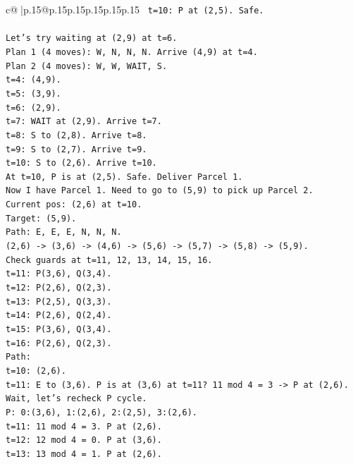 \documentclass{article}
\begin{document}
{\begin{supertabular}{c@{$\;$}|p{.15\linewidth}@{}p{.15\linewidth}p{.15\linewidth}p{.15\linewidth}p{.15\linewidth}p{.15\linewidth}}
{{{\texttt{   t=10: P at (2,5). Safe.} \\
\\ 
\texttt{Let's try waiting at (2,9) at t=6.} \\
\texttt{Plan 1 (4 moves): W, N, N, N. Arrive (4,9) at t=4.} \\
\texttt{Plan 2 (4 moves): W, W, WAIT, S.} \\
\texttt{t=4: (4,9).} \\
\texttt{t=5: (3,9).} \\
\texttt{t=6: (2,9).} \\
\texttt{t=7: WAIT at (2,9). Arrive t=7.} \\
\texttt{t=8: S to (2,8). Arrive t=8.} \\
\texttt{t=9: S to (2,7). Arrive t=9.} \\
\texttt{t=10: S to (2,6). Arrive t=10.} \\
\texttt{At t=10, P is at (2,5). Safe. Deliver Parcel 1.} \\
\texttt{Now I have Parcel 1. Need to go to (5,9) to pick up Parcel 2.} \\
\texttt{Current pos: (2,6) at t=10.} \\
\texttt{Target: (5,9).} \\
\texttt{Path: E, E, E, N, N, N.} \\
\texttt{(2,6) {-}> (3,6) {-}> (4,6) {-}> (5,6) {-}> (5,7) {-}> (5,8) {-}> (5,9).} \\
\texttt{Check guards at t=11, 12, 13, 14, 15, 16.} \\
\texttt{t=11: P(3,6), Q(3,4).} \\
\texttt{t=12: P(2,6), Q(2,3).} \\
\texttt{t=13: P(2,5), Q(3,3).} \\
\texttt{t=14: P(2,6), Q(2,4).} \\
\texttt{t=15: P(3,6), Q(3,4).} \\
\texttt{t=16: P(2,6), Q(2,3).} \\
\texttt{Path:} \\
\texttt{t=10: (2,6).} \\
\texttt{t=11: E to (3,6). P is at (3,6) at t=11? 11 mod 4 = 3 {-}> P at (2,6). Wait, let's recheck P cycle.} \\
\texttt{P: 0:(3,6), 1:(2,6), 2:(2,5), 3:(2,6).} \\
\texttt{t=11: 11 mod 4 = 3. P at (2,6).} \\
\texttt{t=12: 12 mod 4 = 0. P at (3,6).} \\
\texttt{t=13: 13 mod 4 = 1. P at (2,6).} \\
}}}
\end{supertabular}}
\end{document}

